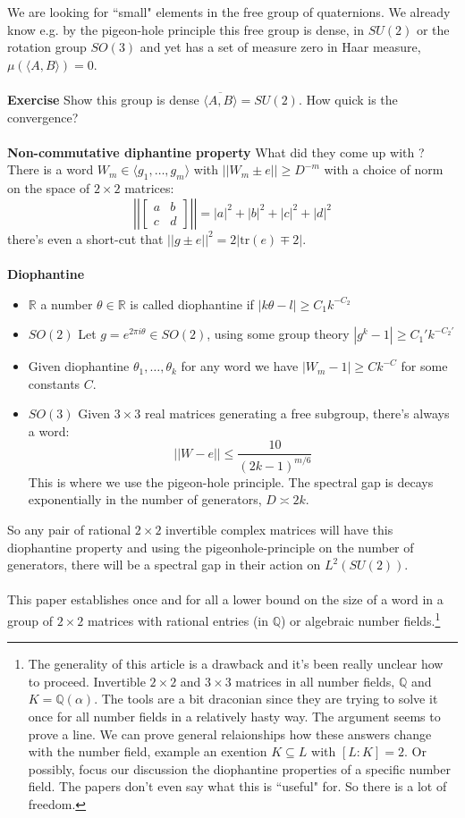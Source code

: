 \documentclass[12pt]{article}
\begin{document}
We are looking for ``small" elements in the free group of quaternions.  We already know e.g. by the pigeon-hole principle this free group is dense, in $SU(2)$ or the rotation group $SO(3)$ and yet has a set of measure zero in Haar measure, $\mu(\langle A, B \rangle) = 0$.\\ \\
\textbf{Exercise} Show this group is dense $\overline{\langle A, B \rangle} = SU(2)$.  How quick is the convergence? \\ \\
\textbf{Non-commutative diphantine property} What did they come up with ? There is a word $W_m \in \langle g_1,  \dots , g_m \rangle  $ with $ ||W_m \pm  e|| \geq D^{-m}$ with a choice of norm on the space of $2 \times 2$ matrices:
$$ \left|\left| \left[ \begin{array}{cc} a & b \\ c & d \end{array} \right] \right|\right| 
= |a|^2 + |b|^2 + |c|^2 + |d|^2 $$  
there's even a short-cut that $||g \pm e||^2 = 2 | \text{tr}(e) \mp 2|$. \\ \\
\textbf{Diophantine} 
\begin{itemize}
\item $\mathbb{R}$ a number $\theta \in \mathbb{R}$ is called diophantine if $|k \theta - l | \geq C_1 k^{-C_2} $
\item $SO(2)$ Let $g = e^{2\pi i \theta} \in SO(2)$, using some group theory $|g^k - 1| \geq C_1' k^{- C_2'}$
\item Given diophantine $\theta_1, \dots, \theta_k$ for any word we have $|W_m -1| \geq C k^{- C} $ for some constants $C$.
\item $SO(3)$ Given $3 \times 3$ real matrices generating a free subgroup, there's always a word:
$$ || W - e || \leq \frac{10}{(2k-1)^{m/6}} $$
This is where we use the pigeon-hole principle.  The spectral gap is decays exponentially in the number of generators, $D \asymp 2k$.
\end{itemize}
So any pair of rational $2 \times 2$ invertible complex matrices will have this diophantine property and using the pigeonhole-principle on the number of generators, there will be a spectral gap in their action on $L^2(SU(2))$.  \\ \\
This paper establishes once and for all a lower bound on the size of a word in a group of $2 \times 2$ matrices with rational entries (in $\mathbb{Q}$) or algebraic number fields.\footnote{The generality of this article is a drawback and it's been really unclear how to proceed.  Invertible $2 \times 2$ and $3 \times 3$ matrices in all number fields, $\mathbb{Q}$ and $K = \mathbb{Q}(\alpha)$.  The tools are a bit draconian since they are trying to solve it once for all number fields in a relatively hasty way.  The argument seems to prove a line.  We can prove general relaionships how these answers change with the number field, example an exention $K \subseteq L$ with $[L:K] = 2$.  Or possibly, focus our discussion the diophantine properties of a specific number field.  The papers don't even say what this is ``useful" for.  So there is a lot of freedom.}
\end{document}
